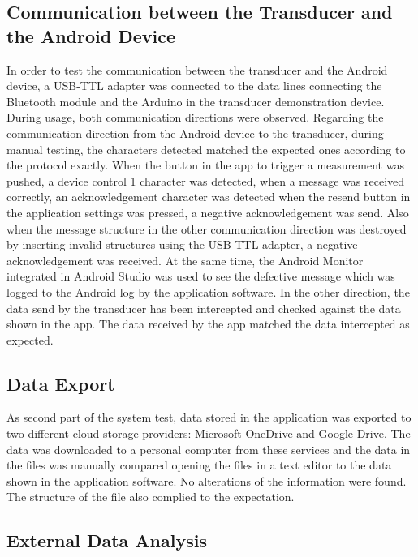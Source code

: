 \subsection{Communication between the Transducer and the Android Device}
In order to test the communication between the transducer and the Android device, a USB-TTL adapter was connected to the data lines connecting the Bluetooth module and the Arduino in the transducer demonstration device. During usage, both communication directions were observed. Regarding the communication direction from the Android device to the transducer, during manual testing, the characters detected matched the expected ones according to the protocol exactly. When the button in the app to trigger a measurement was pushed, a device control 1 character was detected, when a message was received correctly, an acknowledgement character was detected when the resend button in the application settings was pressed, a negative acknowledgement was send. Also when the message structure in the other communication direction was destroyed by inserting invalid structures using the USB-TTL adapter, a negative acknowledgement was received. At the same time, the Android Monitor integrated in Android Studio was used to see the defective message which was logged to the Android log by the application software. In the other direction, the data send by the transducer has been intercepted and checked against the data shown in the app. The data received by the app matched the data intercepted as expected.

\subsection{Data Export}
As second part of the system test, data stored in the application was exported to two different cloud storage providers: Microsoft OneDrive and Google Drive. The data was downloaded to a personal computer from these services and the data in the files was manually compared opening the files in a text editor to the data shown in the application software. No alterations of the information were found. The structure of the file also complied to the expectation.

\subsection{External Data Analysis}
\label{subs:externalDataAnalysis}
